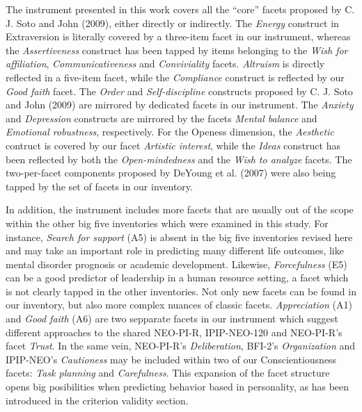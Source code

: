 \documentclass[,man,floatsintext]{apa6}
\begin{document}
The instrument presented in this work covers all the \enquote{core}
facets proposed by C. J. Soto and John (2009), either directly or
indirectly. The \emph{Energy} construct in Extraversion is literally
covered by a three-item facet in our instrument, whereas the
\emph{Assertiveness} construct has been tapped by items belonging to the
\emph{Wish for affiliation}, \emph{Communicativeness} and
\emph{Conviviality} facets. \emph{Altruism} is directly reflected in a
five-item facet, while the \emph{Compliance} construct is reflected by
our \emph{Good faith} facet. The \emph{Order} and \emph{Self-discipline}
constructs proposed by C. J. Soto and John (2009) are mirrored by
dedicated facets in our instrument. The \emph{Anxiety} and
\emph{Depression} constructs are mirrored by the facets \emph{Mental
balance} and \emph{Emotional robustness}, respectively. For the Openess
dimension, the \emph{Aesthetic} contruct is covered by our facet
\emph{Artistic interest}, while the \emph{Ideas} construct has been
reflected by both the \emph{Open-mindedness} and the \emph{Wish to
analyze} facets. The two-per-facet components proposed by DeYoung et al.
(2007) were also being tapped by the set of facets in our inventory.

In addition, the instrument includes more facets that are usually out of
the scope within the other big five inventories which were examined in
this study. For instance, \emph{Search for support} (A5) is absent in
the big five inventories revised here and may take an important role in
predicting many different life outcomes, like mental disorder prognosis
or academic development. Likewise, \emph{Forcefulness} (E5) can be a
good predictor of leadership in a human resource setting, a facet which
is not clearly tapped in the other inventories. Not only new facets can
be found in our inventory, but also more complex nuances of classic
facets. \emph{Appreciation} (A1) and \emph{Good faith} (A6) are two
sepparate facets in our instrument which suggest different approaches to
the shared NEO-PI-R, IPIP-NEO-120 and NEO-PI-R's facet \emph{Trust}. In
the same vein, NEO-PI-R's \emph{Deliberation}, BFI-2's
\emph{Organization} and IPIP-NEO's \emph{Cautioness} may be included
within two of our Conscientiousness facets: \emph{Task planning} and
\emph{Carefulness}. This expansion of the facet structure opens big
posibilities when predicting behavior based in personality, as has been
introduced in the criterion validity section.
\end{document}
